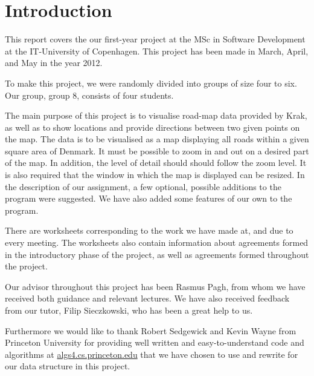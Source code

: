 \section{Introduction}

This report covers the our first-year project at the MSc in Software Development at the IT-University of Copenhagen. This project has been made in March, April, and May in the year 2012. 

To make this project, we were randomly divided into groups of size four to six. Our group, group 8, consists of four students. 

The main purpose of this project is to visualise road-map data provided by Krak, as well as to show locations and provide directions between two given points on the map. The data is to be visualised as a map displaying all roads within a given square area of Denmark.
It must be possible to zoom in and out on a desired part of the map. In addition, the level of detail should should follow the zoom level. It is also required that the window in which the map is displayed can be resized. In the description of our assignment, a few optional, possible additions to the program were suggested. We have also added some features of our own to the program.

There are worksheets corresponding to the work we have made at, and due to every meeting. The worksheets also contain information about agreements formed in the introductory phase of the project, as well as agreements formed throughout the project.

Our advisor throughout this project has been Rasmus Pagh, from whom we have received both guidance and relevant lectures. We have also received feedback from our tutor, Filip Sieczkowski, who has been a great help to us.

Furthermore we would like to thank Robert Sedgewick and Kevin Wayne from Princeton University for providing well written and easy-to-understand code and algorithms at \url{algs4.cs.princeton.edu} that we have chosen to use and rewrite for our data structure in this project.